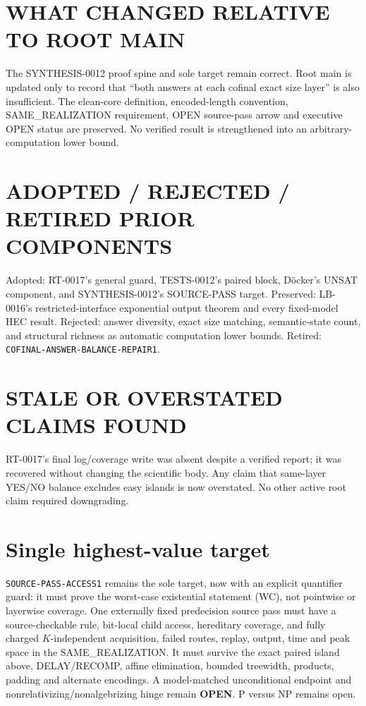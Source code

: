 \documentclass[11pt]{article}
\newcommand{\OPEN}{\textbf{OPEN}}
\begin{document}
\section{WHAT CHANGED RELATIVE TO ROOT MAIN}

The SYNTHESIS-0012 proof spine and sole target remain correct.  Root main is
updated only to record that ``both answers at each cofinal exact size layer''
is also insufficient.  The clean-core definition, encoded-length convention,
SAME\_REALIZATION requirement, OPEN source-pass arrow and executive OPEN
status are preserved.  No verified result is strengthened into an
arbitrary-computation lower bound.

\section{ADOPTED / REJECTED / RETIRED PRIOR COMPONENTS}

Adopted: RT-0017's general guard, TESTS-0012's paired block, D\"ocker's UNSAT
component, and SYNTHESIS-0012's SOURCE-PASS target.  Preserved: LB-0016's
restricted-interface exponential output theorem and every fixed-model HEC
result.  Rejected: answer diversity, exact size matching, semantic-state count,
and structural richness as automatic computation lower bounds.  Retired:
\texttt{COFINAL-ANSWER-BALANCE-REPAIR1}.

\section{STALE OR OVERSTATED CLAIMS FOUND}

RT-0017's final log/coverage write was absent despite a verified report; it was
recovered without changing the scientific body.  Any claim that same-layer
YES/NO balance excludes easy islands is now overstated.  No other active root
claim required downgrading.

\section{Single highest-value target}

\texttt{SOURCE-PASS-ACCESS1} remains the sole target, now with an explicit
quantifier guard: it must prove the worst-case existential statement (WC), not
pointwise or layerwise coverage.  One externally fixed predecision source pass
must have a source-checkable rule, bit-local child access, hereditary coverage,
and fully charged $K$-independent acquisition, failed routes, replay, output,
time and peak space in the SAME\_REALIZATION.  It must survive the exact paired
island above, DELAY/RECOMP, affine elimination, bounded treewidth, products,
padding and alternate encodings.  A model-matched unconditional endpoint and
nonrelativizing/nonalgebrizing hinge remain \OPEN{}.  P versus NP remains open.
\end{document}
